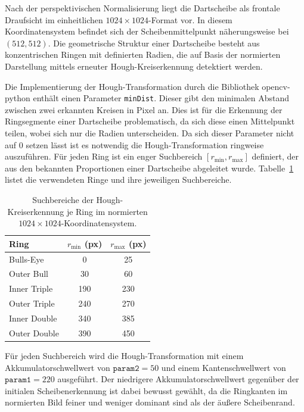 Nach der perspektivischen Normalisierung liegt die Dartscheibe als
frontale Draufsicht im einheitlichen $1024 \times 1024$-Format vor.
In diesem Koordinatensystem befindet sich der Scheibenmittelpunkt
näherungsweise bei $(512, 512)$. Die geometrische Struktur einer
Dartscheibe besteht aus konzentrischen Ringen mit definierten Radien,
die auf Basis der normierten Darstellung mittels erneuter
Hough-Kreiserkennung detektiert werden.

Die Implementierung der Hough-Transformation durch die Bibliothek opencv-python enthält einen Parameter \texttt{minDist}. Dieser gibt den minimalen Abstand zwischen zwei erkannten Kreisen in Pixel an. Dies ist für die Erkennung der Ringsegmente einer Dartscheibe problematisch, da sich diese einen Mittelpunkt teilen, wobei sich nur die Radien unterscheiden. Da sich dieser Parameter nicht auf 0 setzen lässt ist es notwendig die Hough-Transformation ringweise auszuführen. Für jeden Ring ist ein enger Suchbereich $[r_{\min}, r_{\max}]$ definiert, der aus den bekannten Proportionen einer Dartscheibe abgeleitet wurde. Tabelle~\ref{tab:ring-definitions} listet die verwendeten Ringe und
ihre jeweiligen Suchbereiche.

\begin{table}[h]
    \centering
    \begin{tabular}{lcc}
        \toprule
        \textbf{Ring}   & $r_{\min}$ (px) & $r_{\max}$ (px) \\
        \midrule
        Bulls-Eye       & 0   & 25  \\
        Outer Bull      & 30  & 60  \\
        Inner Triple    & 190 & 230 \\
        Outer Triple    & 240 & 270 \\
        Inner Double    & 340 & 385 \\
        Outer Double    & 390 & 450 \\
        \bottomrule
    \end{tabular}
    \caption{Suchbereiche der Hough-Kreiserkennung je Ring im
             normierten $1024 \times 1024$-Koordinatensystem.}
    \label{tab:ring-definitions}
\end{table}

Für jeden Suchbereich wird die Hough-Transformation mit einem
Akkumulatorschwellwert von $\mathtt{param2} = 50$ und einem
Kantenschwellwert von $\mathtt{param1} = 220$ ausgeführt. Der
niedrigere Akkumulatorschwellwert gegenüber der initialen
Scheibenerkennung ist dabei bewusst gewählt, da die Ringkanten im
normierten Bild feiner und weniger dominant sind als der äußere
Scheibenrand.

